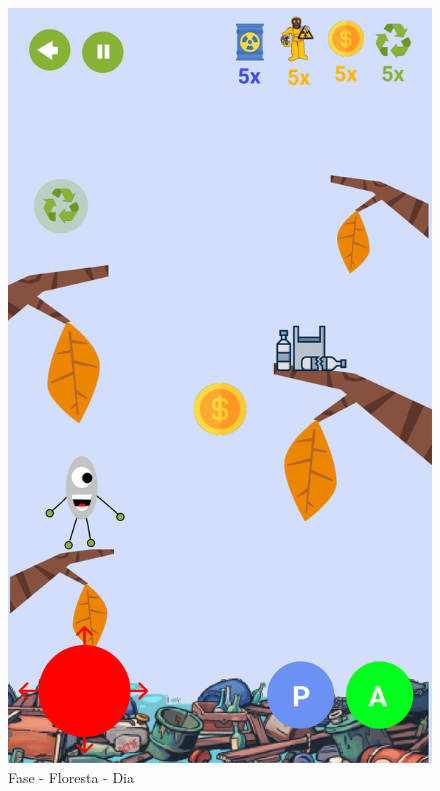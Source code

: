 \documentclass[]{scrartcl}
\begin{document}
\begin{figure}[H]
	\begin{center}
		\includegraphics[scale=0.3]{figs/Game Design-09.png}
		\caption{Fase - Floresta - Dia}
	\end{center}
\end{figure}
\end{document}
